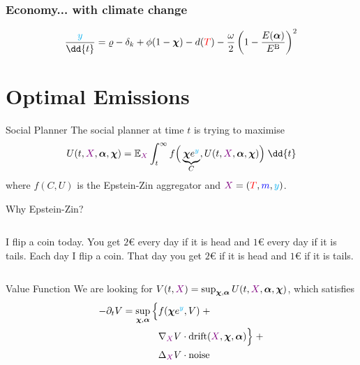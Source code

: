 \documentclass[pdf]{beamer}
\let\d\relax
\newcommand{\d}[1]{\mathrm{d}#1}
\newcommand{\control}[1]{\bm{#1}}
\newcommand{\X}{{\color{violet} X}}
\begin{document}
\begin{frame} \frametitle{Economy... with climate change}
    \begin{equation*}
        \frac{\d {{\color{cyan} y}}}{\dd{t}} = \varrho - \delta_k + \phi(1 - \control{\chi}) - d({\color{red} T}) - \frac{\omega}{2} \left(1 - \frac{E(\control{\alpha})}{E^{\mathrm{B}}} \right)^2
    \end{equation*}
\end{frame}

\section{Optimal Emissions}

\begin{frame}{Social Planner}
    The social planner at time $t$ is trying to maximise \begin{equation*}
        U(t, \X, \control{\alpha}, \control{\chi}) = \mathbb{E}_{\X} \int^\infty_t f\Big(\underbrace{\control{\chi} e^{{\color{cyan} y}}}_{C}, U(t, \X, \control{\alpha}, \control{\chi})\Big) \; \dd{t}
    \end{equation*} where $f(C, U)$ is the Epstein-Zin aggregator and $\X = ({\color{red} T}, {\color{blue} m}, {\color{cyan} y})$.
\end{frame}

\begin{frame}{Why Epstein-Zin?}
    \begin{columns}
        \pause {}
        I flip a coin today. You get $2$€ every day if it is head and $1$€ every day if it is tails.
        \pause {}
        Each day I flip a coin. That day you get $2$€ if it is head and $1$€ if it is tails.
    \end{columns}
\end{frame}

\begin{frame}{Value Function}
    We are looking for $V(t, \X) = \sup_{\control{\chi}, \control{\alpha}} U(t, \X, \control{\alpha}, \control{\chi})$, which satisfies
    \begin{equation*}
        \begin{split}
            -\partial_t V = \sup_{\control{\chi}, \control{\alpha}} \Big\{ &f(\control{\chi} e^{\color{cyan} y}, V) \; +\\
            &\nabla_{\X} V \cdot \text{drift}(\X, \control{\chi}, \control{\alpha}) \Big\} \; + \\
            &\Delta_{\X} V \cdot \text{noise}
        \end{split}
    \end{equation*}
\end{frame}
\end{document}
